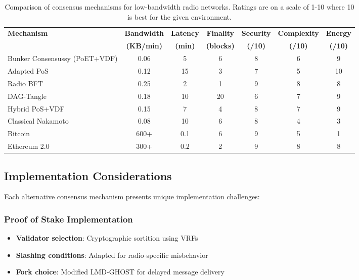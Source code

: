 \documentclass[11pt,a4paper]{article}
\begin{document}
\begin{table}[h]
\centering
\begin{tabular}{|l|c|c|c|c|c|c|}
\hline
\textbf{Mechanism} & \textbf{Bandwidth} & \textbf{Latency} & \textbf{Finality} & \textbf{Security} & \textbf{Complexity} & \textbf{Energy} \\
 & \textbf{(KB/min)} & \textbf{(min)} & \textbf{(blocks)} & \textbf{(/10)} & \textbf{(/10)} & \textbf{(/10)} \\
\hline
Bunker Consensussy (PoET+VDF) & 0.06 & 5 & 6 & 8 & 6 & 9 \\
\hline
Adapted PoS & 0.12 & 15 & 3 & 7 & 5 & 10 \\
\hline
Radio BFT & 0.25 & 2 & 1 & 9 & 8 & 8 \\
\hline
DAG-Tangle & 0.18 & 10 & 20 & 6 & 7 & 9 \\
\hline
Hybrid PoS+VDF & 0.15 & 7 & 4 & 8 & 7 & 9 \\
\hline
Classical Nakamoto & 0.08 & 10 & 6 & 8 & 4 & 3 \\
\hline
Bitcoin & 600+ & 0.1 & 6 & 9 & 5 & 1 \\
\hline
Ethereum 2.0 & 300+ & 0.2 & 2 & 9 & 8 & 8 \\
\hline
\end{tabular}
\caption{Comparison of consensus mechanisms for low-bandwidth radio networks. Ratings are on a scale of 1-10 where 10 is best for the given environment.}
\label{tab:consensus_comparison}
\end{table}

\subsection{Implementation Considerations}

Each alternative consensus mechanism presents unique implementation challenges:

\subsubsection{Proof of Stake Implementation}

\begin{itemize}
\item \textbf{Validator selection}: Cryptographic sortition using VRFs
\item \textbf{Slashing conditions}: Adapted for radio-specific misbehavior
\item \textbf{Fork choice}: Modified LMD-GHOST for delayed message delivery
\end{itemize}
\end{document}
